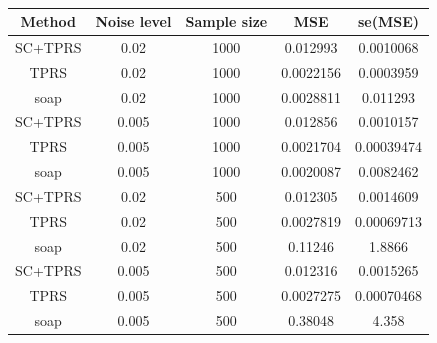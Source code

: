 \documentclass[a4paper,10pt]{amsart}
\begin{document}
\begin{table}[ht]
\begin{tabular}{c c c c c}\\
Method & Noise level & Sample size & MSE & se(MSE)\\
\hline
\hline
SC+TPRS & 0.02 & 1000 & 0.012993 & 0.0010068\\
TPRS & 0.02 & 1000 & 0.0022156 & 0.0003959\\
soap & 0.02 & 1000 & 0.0028811 & 0.011293\\
SC+TPRS & 0.005 & 1000 & 0.012856 & 0.0010157\\
TPRS & 0.005 & 1000 & 0.0021704 & 0.00039474\\
soap & 0.005 & 1000 & 0.0020087 & 0.0082462\\
SC+TPRS & 0.02 & 500 & 0.012305 & 0.0014609\\
TPRS & 0.02 & 500 & 0.0027819 & 0.00069713\\
soap & 0.02 & 500 & 0.11246 & 1.8866\\
SC+TPRS & 0.005 & 500 & 0.012316 & 0.0015265\\
TPRS & 0.005 & 500 & 0.0027275 & 0.00070468\\
soap & 0.005 & 500 & 0.38048 & 4.358\\
\end{tabular}
\caption{}
\label{example 4}
\end{table}
\end{document}
